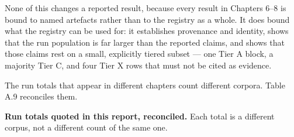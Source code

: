 \documentclass[12pt,a4paper]{report}
\begin{document}
None of this changes a reported result, because every result in Chapters
6--8 is bound to named artefacts rather than to the registry as a whole.
It does bound what the registry can be used for: it establishes
provenance and identity, shows that the run population is far larger
than the reported claims, and shows that those claims rest on a small,
explicitly tiered subset --- one Tier A block, a majority Tier C, and
four Tier X rows that must not be cited as evidence.

The run totals that appear in different chapters count different
corpora. Table A.9 reconciles them.

\textbf{Run totals quoted in this report, reconciled.} Each total is a
different corpus, not a different count of the same one.

\begingroup\scriptsize\setlength{\tabcolsep}{3pt}
\end{document}
